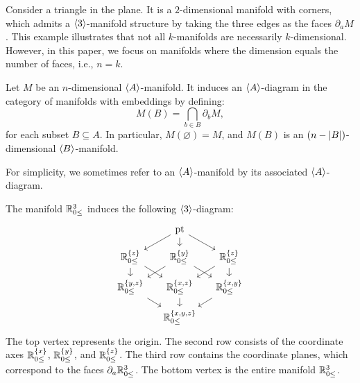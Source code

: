 \begin{exmp}
Consider a triangle in the plane. It is a $2$-dimensional manifold with corners, which admits a $\langle 3 \rangle$-manifold structure by taking the three edges as the faces $\partial_a M$. This example illustrates that not all $k$-manifolds are necessarily $k$-dimensional. However, in this paper, we focus on manifolds where the dimension equals the number of faces, i.e., $n = k$.
\end{exmp}


\begin{constr}\label{ex:mfld_diagram}
    Let $M$ be an $n$-dimensional $\langle A \rangle$-manifold. It induces an $\langle A \rangle$-diagram in the category of manifolds with embeddings by defining:
    \begin{equation*}
        M(B) = \bigcap_{b \in B} \partial_b M,
    \end{equation*}
    for each subset $B \subseteq A$. In particular, $M(\varnothing) = M$, and $M(B)$ is an $(n - \left\lvert B\right\rvert)$-dimensional $\langle B \rangle$-manifold.    
\end{constr}
\begin{rem*}
For simplicity, we sometimes refer to an $\langle A \rangle$-manifold by its associated $\langle A \rangle$-diagram.
\end{rem*}

\begin{exmp}
The manifold $\mathbb{R}_{0 \leq}^3$ induces the following $\langle 3 \rangle$-diagram:
\[
\begin{tikzcd}[row sep=small, column sep=small]
    & \text{pt} \\
    {\Hlf^{\{ z \}}} & {\Hlf^{\{ y \}}} & {\Hlf^{\{ z \}}} \\
    {\Hlf^{\{ y,z \}}} & {\Hlf^{\{ x,z \}}} & {\Hlf^{\{ x,y \}}} \\
    & {\Hlf^{\{ x,y,z \}}}
    \arrow[from=1-2, to=2-1]
    \arrow[from=1-2, to=2-2]
    \arrow[from=1-2, to=2-3]
    \arrow[from=2-1, to=3-1]
    \arrow[from=2-1, to=3-2]
    \arrow[from=2-2, to=3-1]
    \arrow[from=2-2, to=3-3]
    \arrow[from=2-3, to=3-2]
    \arrow[from=2-3, to=3-3]
    \arrow[from=3-1, to=4-2]
    \arrow[from=3-2, to=4-2]
    \arrow[from=3-3, to=4-2]
\end{tikzcd}
\]
The top vertex represents the origin. The second row consists of the coordinate axes $\mathbb{R}_{0 \leq}^{\{ x \}}$, $\mathbb{R}_{0 \leq}^{\{ y \}}$, and $\mathbb{R}_{0 \leq}^{\{ z \}}$. The third row contains the coordinate planes, which correspond to the faces $\partial_a \mathbb{R}_{0 \leq}^3$. The bottom vertex is the entire manifold $\mathbb{R}_{0 \leq}^3$.
\end{exmp}

